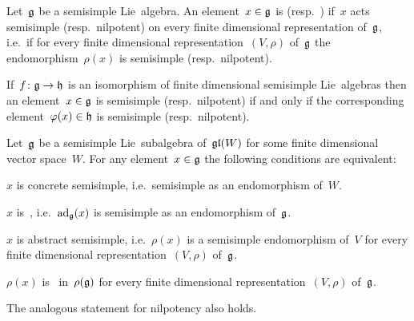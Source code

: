 \begin{definition}
  Let~$\mathfrak{g}$ be a semisimple Lie~algebra.
  An element~$x \in \mathfrak{g}$ is  (resp.\ ) if~$x$ acts semisimple (resp.\ nilpotent) on every finite dimensional representation of~$\mathfrak{g}$, i.e.\ if for every finite dimensional representation~$(V,\rho)$ of~$\mathfrak{g}$ the endomorphism~$\rho(x)$ is semisimple (resp.\ nilpotent).
\end{definition}


\begin{remark}
  If~$f \colon \mathfrak{g} \to \mathfrak{h}$ is an isomorphism of finite dimensional semisimple Lie~algebras then an element~$x \in \mathfrak{g}$ is semisimple (resp.\ nilpotent) if and only if the corresponding element~$\varphi(x) \in \mathfrak{h}$ is semisimple (resp.\ nilpotent).
\end{remark}


\begin{lemma}
  \label{characterizations of semisimple elements}
  Let~$\mathfrak{g}$ be a semisimple Lie~subalgebra of~$\mathfrak{gl}(W)$ for some finite dimensional vector space~$W$.
  For any element~$x \in \mathfrak{g}$ the following conditions are equivalent:
  \begin{equivalenceslist}
    \item
      \label{concrete semisimple}
      $x$ is concrete semisimple, i.e.\ semisimple as an endomorphism of~$W$.
    \item
      \label{adsemisimple}
      $x$ is~{\adsemisimple}, i.e.~$\operatorname{ad}_{\mathfrak{g}}(x)$ is semisimple as an endomorphism of~$\mathfrak{g}$.
    \item
      \label{abstract semisimple}
      $x$ is abstract semisimple, i.e.~$\rho(x)$ is a semisimple endomorphism of~$V$ for every finite dimensional representation~$(V,\rho)$ of~$\mathfrak{g}$.
    \item
      \label{rep adsemisimple}
      $\rho(x)$ is~{\adsemisimple} in~$\rho(\mathfrak{g})$ for every finite dimensional representation~$(V,\rho)$ of~$\mathfrak{g}$.
  \end{equivalenceslist}
  The analogous statement for nilpotency also holds.
\end{lemma}


